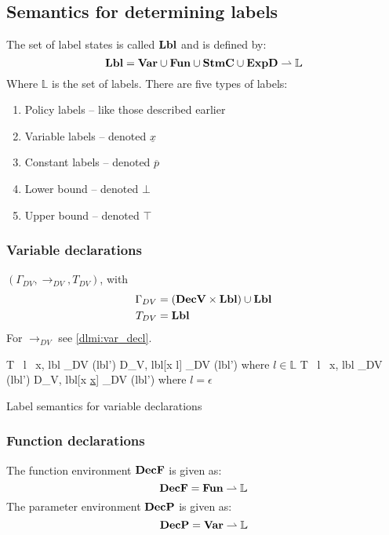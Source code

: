 \subsection{Semantics for determining labels}
The set of label states is called $\mathbf{Lbl}$ and is defined by:
\[
  \mathbf{Lbl} = \mathbf{Var} \cup \mathbf{Fun} \cup \mathbf{StmC} \cup \mathbf{ExpD} \rightharpoonup \mathbb{L}
\]
Where $\mathbb{L}$ is the set of labels.
There are five types of labels:
\begin{enumerate}
  \item Policy labels -- like those described earlier
  \item Variable labels -- denoted $\underline{x}$
  \item Constant labels -- denoted $\overline{p}$
  \item Lower bound -- denoted $\bot$
  \item Upper bound -- denoted $\top$
\end{enumerate}

\subsubsection{Variable declarations}
$(\Gamma_{DV}, \rightarrow_{DV}, T_{DV})$, with
\begin{align*}
  \Gamma_{DV} & = (\mathbf{DecV} \times \mathbf{Lbl}) \cup \mathbf{Lbl} \\
  T_{DV} & = \mathbf{Lbl} \\
\end{align*}
For $\rightarrow_{DV}$ see \cref{dlmi:var_decl}.

\begin{table}
        {\langle T \, l \, x, lbl \rangle \rightarrow_{DV} (lbl')}
        {\langle D_V, lbl[x \mapsto l] \rangle \rightarrow_{DV} (lbl')}
        {where $l \in \mathbb{L}$}
        {\langle T \, l \, x, lbl \rangle \rightarrow_{DV} (lbl')}
        {\langle D_V, lbl[x \mapsto \underline{x}] \rangle \rightarrow_{DV} (lbl')}
        {where $l = \epsilon$}
\caption{Label semantics for variable declarations}
\label{dlmi:var_decl}
\end{table}

\subsubsection{Function declarations}
The function environment $\mathbf{DecF}$ is given as:
\[ \mathbf{DecF} = \mathbf{Fun} \rightharpoonup \mathbb{L} \]
The parameter environment $\mathbf{DecP}$ is given as:
\[ \mathbf{DecP} = \mathbf{Var} \rightharpoonup \mathbb{L} \]

